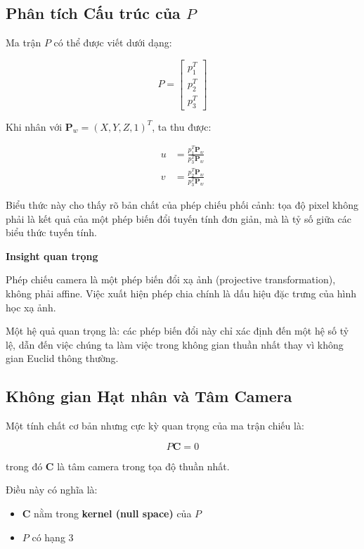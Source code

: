 \subsection{Phân tích Cấu trúc của $P$}
\label{subsec:projection_structure}

Ma trận $P$ có thể được viết dưới dạng:

\[
P =
\begin{bmatrix}
	p_1^T \\
	p_2^T \\
	p_3^T
\end{bmatrix}
\]

Khi nhân với $\mathbf{P}_w = (X, Y, Z, 1)^T$, ta thu được:

\[
\begin{aligned}
	u &= \frac{p_1^T \mathbf{P}_w}{p_3^T \mathbf{P}_w} \\
	v &= \frac{p_2^T \mathbf{P}_w}{p_3^T \mathbf{P}_w}
\end{aligned}
\]

Biểu thức này cho thấy rõ bản chất của phép chiếu phối cảnh: tọa độ pixel không phải là kết quả của một phép biến đổi tuyến tính đơn giản, mà là tỷ số giữa các biểu thức tuyến tính.

\begin{mdframed}[style=infobox]
	\textbf{Insight quan trọng}
	
	Phép chiếu camera là một phép biến đổi xạ ảnh (projective transformation), không phải affine. Việc xuất hiện phép chia chính là dấu hiệu đặc trưng của hình học xạ ảnh.
\end{mdframed}

Một hệ quả quan trọng là: các phép biến đổi này chỉ xác định đến một hệ số tỷ lệ, dẫn đến việc chúng ta làm việc trong không gian thuần nhất thay vì không gian Euclid thông thường.

\subsection{Không gian Hạt nhân và Tâm Camera}
\label{subsec:camera_center}

Một tính chất cơ bản nhưng cực kỳ quan trọng của ma trận chiếu là:

\[
P \mathbf{C} = 0
\]

trong đó $\mathbf{C}$ là tâm camera trong tọa độ thuần nhất.

Điều này có nghĩa là:
\begin{itemize}
	\item $\mathbf{C}$ nằm trong \textbf{kernel (null space)} của $P$
	\item $P$ có hạng 3
\end{itemize}

